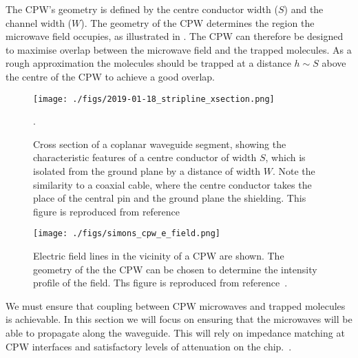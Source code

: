 %
The CPW's geometry is defined by the centre conductor width ($S$) and the
channel width ($W$). The geometry of the CPW determines the region the microwave
field occupies, as illustrated in . The CPW
can therefore be designed to maximise overlap between the microwave field and
the trapped molecules. As a rough approximation the molecules should be trapped
at a distance $h\sim S$ above the centre of the CPW to achieve a good
overlap.~\cite{Boehi2009}


\begin{figure}
  \texttt{[image: ./figs/2019-01-18\_stripline\_xsection.png]}
  \caption{
    Cross section of a coplanar waveguide segment, showing the characteristic
    features of a centre conductor of width $S$, which is isolated from the
    ground plane by a distance of width $W$. Note the similarity to a coaxial
    cable, where the centre conductor takes the place of the central pin and the
    ground plane the shielding. This figure is reproduced from
    reference~\cite{Simons2004}}.
  \label{experiment:fig:CPWxsec}
\end{figure}


\begin{figure}
  \texttt{[image: ./figs/simons\_cpw\_e\_field.png]}
  \caption{
    Electric field lines in the vicinity of a CPW are shown. The geometry of the 
    the CPW can be chosen to determine the intensity profile of the field. Ths
    figure is reproduced from reference~\cite{Simons2004}.
  }
  \label{experiment:fig:CPWfield}
\end{figure}

We must ensure that coupling between CPW microwaves and trapped molecules is
achievable. In this section we will focus on ensuring that the microwaves will
be able to propagate along the waveguide. This will rely on impedance matching
at CPW interfaces and satisfactory levels of attenuation on the
chip.~\cite{Jackson1975, Simons2004}.

